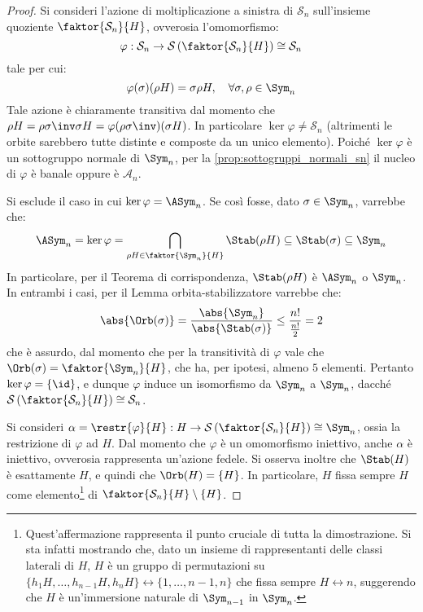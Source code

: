 \documentclass[11pt]{scrartcl}
\begin{document}
	\begin{proof}
		Si consideri l'azione di moltiplicazione a sinistra di $\mathcal{S}_n$ sull'insieme
		quoziente $\faktor{\mathcal{S}_n}{H}$, ovverosia l'omomorfismo:
		\[
		\varphi: \mathcal{S}_n \to \mathcal{S}\left(\faktor{\mathcal{S}_n}{H}\right) \cong \mathcal{S}_n
		\]
		tale per cui:
		\[
			\varphi(\sigma)(\rho H) = \sigma \rho H, \quad \forall \sigma, \rho \in \Sym_n
		\]
		Tale azione è chiaramente transitiva dal momento che $\rho H = \rho \sigma\inv \sigma H = \varphi(\rho \sigma\inv)(\sigma H)$.
		In particolare $\ker \varphi \neq \mathcal{S}_n$ (altrimenti le orbite sarebbero tutte distinte e composte da un unico elemento). Poiché $\ker\varphi$ è un sottogruppo normale di $\Sym_n$, per la
		\autoref{prop:sottogruppi_normali_sn}
		il nucleo di $\varphi$ è banale oppure è $\mathcal{A}_n$. \medskip
		
		
		Si esclude il caso in cui $\ker \varphi = \ASym_n$. Se così fosse, dato $\sigma \in \Sym_n$,
		varrebbe che:
		\[ \ASym_n = \ker \varphi = \bigcap_{\rho H \in \faktor{\Sym_n}{H}} \Stab(\rho H) \subseteq \Stab(\sigma) \subseteq \Sym_n \]
		In particolare, per il Teorema di corrispondenza, $\Stab(\rho H)$ è $\ASym_n$ o $\Sym_n$. In entrambi
		i casi,
		per il Lemma orbita-stabilizzatore varrebbe che:
		\[ \abs{\Orb(\sigma)} = \frac{\abs{\Sym_n}}{\abs{\Stab(\sigma)}} \leq \frac{n!}{\frac{n!}{2}} = 2 \]
		che è assurdo, dal momento che per la transitività di $\varphi$ vale che $\Orb(\sigma) = \faktor{\Sym_n}{H}$, che ha, per ipotesi, almeno $5$ elementi. Pertanto $\ker \varphi = \{\id\}$,
		e dunque $\varphi$ induce un isomorfismo da $\Sym_n$ a $\Sym_n$, dacché
		$\mathcal{S}\left(\faktor{\mathcal{S}_n}{H}\right) \cong \mathcal{S}_n$. \medskip

		Si consideri $\alpha = \restr{\varphi}{H} : H \to \mathcal{S}\left(\faktor{\mathcal{S}_n}{H}\right) \cong \Sym_{n}$,
		ossia la restrizione di $\varphi$ ad $H$. Dal momento che $\varphi$ è un omomorfismo iniettivo, anche
		$\alpha$ è iniettivo, ovverosia rappresenta un'azione fedele. Si osserva inoltre che
		$\Stab(H)$ è esattamente $H$, e quindi che $\Orb(H) = \{H\}$. In particolare, $H$ fissa sempre
		$H$ come elemento\footnote{
			Quest'affermazione rappresenta il punto cruciale di tutta la dimostrazione. Si sta infatti
			mostrando che, dato un insieme di rappresentanti delle classi laterali di $H$, $H$ è un gruppo di permutazioni su $\{h_1 H, \ldots, h_{n-1} H, h_n H\} \leftrightarrow \{1, \ldots, n-1, n\}$ che fissa
			sempre $H \leftrightarrow n$, suggerendo che $H$ è un'immersione naturale di $\Sym_{n-1}$ in $\Sym_n$.
		} di $\faktor{\mathcal{S}_n}{H} \setminus \{H\}$. \medskip
		

\end{proof}
\end{document}

